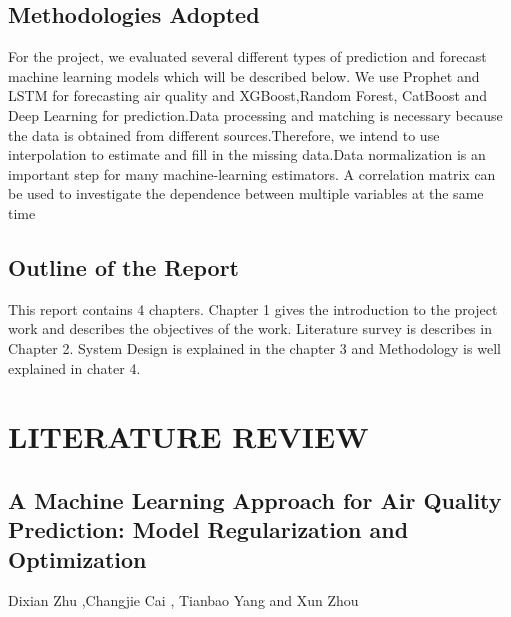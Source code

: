 \pagebreak
\section{Methodologies Adopted}
For the project, we evaluated several different types of prediction and forecast machine learning  models which will be described below. We use Prophet and LSTM for forecasting air quality and XGBoost,Random Forest, CatBoost and Deep Learning for prediction.Data processing and matching is necessary because the data is obtained from diﬀerent sources.Therefore, we intend to use interpolation to estimate and ﬁll in the missing data.Data normalization is an important step for many machine-learning estimators. A correlation matrix can be used to investigate the dependence between multiple variables at the same time


\section{Outline of the Report}
This report contains 4 chapters. Chapter 1 gives the introduction to the project work and
describes the objectives of the work. Literature survey is describes in Chapter 2. System
Design is explained in the chapter 3 and Methodology  is well explained
in chater 4. 


\chapter{LITERATURE REVIEW}

\section{A Machine Learning Approach for Air Quality Prediction: Model Regularization and Optimization}

Dixian Zhu ,Changjie Cai , Tianbao Yang and Xun Zhou 

